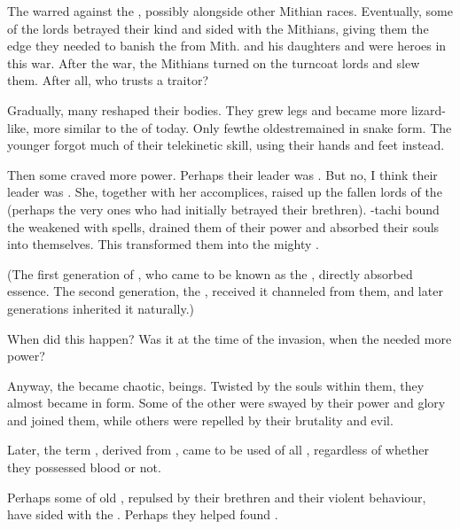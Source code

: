 The \ophidians{} warred against the \thzantzais, possibly alongside other Mithian races. Eventually, some of the \thzantzai{} lords betrayed their kind and sided with the Mithians, giving them the edge they needed to banish the \thzantzais{} from Mith. \HesodNerga{} and his daughters \Tiamat{} and \KhothSell{} were heroes in this war. After the war, the Mithians turned on the turncoat \thzantzai{} lords and slew them. After all, who trusts a traitor?

Gradually, many \ophidians{} reshaped their bodies. They grew legs and became more lizard-like, more similar to the \dragons{} of today. Only few\dash the oldest\dash remained in snake form. The younger \ophidians{} forgot much of their telekinetic skill, using their hands and feet instead. 

Then some \ophidians{} craved more power. Perhaps their leader was \HesodNerga. But no, I think their leader was \Tiamat. She, together with her accomplices, raised up the fallen lords of the \thzantzais{} (perhaps the very ones who had initially betrayed their brethren). \Tiamat-tachi bound the weakened \thzantzais{} with spells, drained them of their power and absorbed their souls into themselves. This transformed them into the mighty \draecchonosh. 

(The first generation of \draecchonosh{}, who came to be known as the \firstgendragons{}, directly absorbed \thzantzai{} essence. The second generation, the \secondgendragons{}, received it channeled from them, and later generations inherited it naturally.) 

When did this happen? Was it at the time of the \bane{} invasion, when the \ophidians{} needed more power? 

Anyway, the \draecchonosh{} became chaotic, \daemonic{} beings. Twisted by the \thzantzaic{} souls within them, they almost became \thzantzais{} in \ophidian{} form. Some of the other \ophidians{} were swayed by their power and glory and joined them, while others were repelled by their brutality and evil. 

Later, the term \quo\dragon, derived from \quo\draecchonosh, came to be used of all \ophidians, regardless of whether they possessed \thzantzaic{} blood or not. 

Perhaps some of old \ophidians, repulsed by their \draconic{} brethren and their violent behaviour, have sided with the \resphain. Perhaps they helped found \Mystraacht. 



